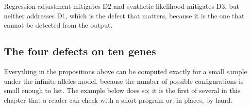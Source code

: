 \begin{remark}
Regression adjustment \citep{suff:beaumont2002} mitigates D2 and synthetic likelihood
mitigates D3, but neither addresses D1, which is the defect that matters, because it is the
one that cannot be detected from the output.
\end{remark}

\subsection{The four defects on ten genes}

Everything in the propositions above can be computed exactly for a small sample under the
infinite alleles model, because the number of possible configurations is small enough to list.
The example below does so; it is the first of several in this chapter that a reader can check
with a short program or, in places, by hand.

